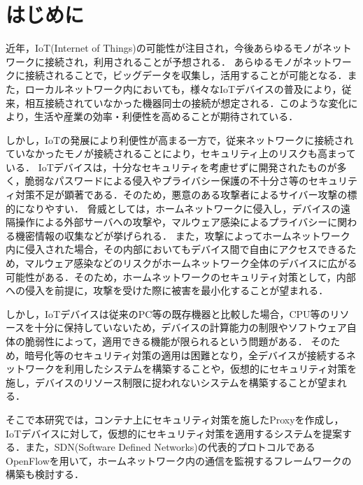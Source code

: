 \documentclass[Japanese]{dicomopapers}
\begin{document}
\section{はじめに}
近年，IoT(Internet of Things)の可能性が注目され，今後あらゆるモノがネットワークに接続され，利用されることが予想される\cite{num}．
あらゆるモノがネットワークに接続されることで，ビッグデータを収集し，活用することが可能となる．また，ローカルネットワーク内においても，様々なIoTデバイスの普及により，従来，相互接続されていなかった機器同士の接続が想定される．このような変化により，生活や産業の効率・利便性を高めることが期待されている\cite{expect}．\par
しかし，IoTの発展により利便性が高まる一方で，従来ネットワークに接続されていなかったモノが接続されることにより，セキュリティ上のリスクも高まっている\cite{security}．
IoTデバイスは，十分なセキュリティを考慮せずに開発されたものが多く，脆弱なパスワードによる侵入やプライバシー保護の不十分さ等のセキュリティ対策不足が顕著である\cite{owasp}．そのため，悪意のある攻撃者によるサイバー攻撃の標的になりやすい．
脅威としては，ホームネットワークに侵入し，デバイスの遠隔操作による外部サーバへの攻撃や，マルウェア感染によるプライバシーに関わる機密情報の収集などが挙げられる．
また，攻撃によってホームネットワーク内に侵入された場合，その内部においてもデバイス間で自由にアクセスできるため，マルウェア感染などのリスクがホームネットワーク全体のデバイスに広がる可能性がある．そのため，ホームネットワークのセキュリティ対策として，内部への侵入を前提に，攻撃を受けた際に被害を最小化することが望まれる．\par
しかし，IoTデバイスは従来のPC等の既存機器と比較した場合，CPU等のリソースを十分に保持していない\cite{camera}ため，デバイスの計算能力の制限やソフトウェア自体の脆弱性によって，適用できる機能が限られるという問題がある\cite{disap}．
そのため，暗号化等のセキュリティ対策の適用は困難となり，全デバイスが接続するネットワークを利用したシステムを構築することや，仮想的にセキュリティ対策を施し，デバイスのリソース制限に捉われないシステムを構築することが望まれる．\par
そこで本研究では，コンテナ上にセキュリティ対策を施したProxyを作成し，IoTデバイスに対して，仮想的にセキュリティ対策を適用するシステムを提案する．また，SDN(Software Defined Networks)の代表的プロトコルであるOpenFlow\cite{openflow}を用いて，ホームネットワーク内の通信を監視するフレームワークの構築も検討する．
\end{document}
